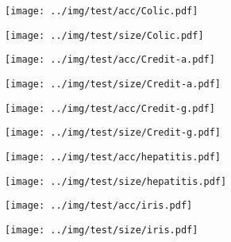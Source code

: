 \begin{figure}[h]
\centering
\begin{subfigure}[b]{0.45\textwidth}
\texttt{[image: ../img/test/acc/Colic.pdf]}
\caption{}
\end{subfigure}
\qquad
\begin{subfigure}[b]{0.45\textwidth}
\texttt{[image: ../img/test/size/Colic.pdf]}
\caption{}
\end{subfigure}
\caption{}
\end{figure}

\begin{figure}[h]
\centering
\begin{subfigure}[b]{0.45\textwidth}
\texttt{[image: ../img/test/acc/Credit-a.pdf]}
\caption{}
\end{subfigure}
\qquad
\begin{subfigure}[b]{0.45\textwidth}
\texttt{[image: ../img/test/size/Credit-a.pdf]}
\caption{}
\end{subfigure}
\caption{}
\end{figure}

\begin{figure}[h]
\centering
\begin{subfigure}[b]{0.45\textwidth}
\texttt{[image: ../img/test/acc/Credit-g.pdf]}
\caption{}
\end{subfigure}
\qquad
\begin{subfigure}[b]{0.45\textwidth}
\texttt{[image: ../img/test/size/Credit-g.pdf]}
\caption{}
\end{subfigure}
\caption{}
\end{figure}

\begin{figure}[h]
\centering
\begin{subfigure}[b]{0.45\textwidth}
\texttt{[image: ../img/test/acc/hepatitis.pdf]}
\caption{}
\end{subfigure}
\qquad
\begin{subfigure}[b]{0.45\textwidth}
\texttt{[image: ../img/test/size/hepatitis.pdf]}
\caption{}
\end{subfigure}
\caption{}
\end{figure}

\begin{figure}[h]
\centering
\begin{subfigure}[b]{0.45\textwidth}
\texttt{[image: ../img/test/acc/iris.pdf]}
\caption{}
\end{subfigure}
\qquad
\begin{subfigure}[b]{0.45\textwidth}
\texttt{[image: ../img/test/size/iris.pdf]}
\caption{}
\end{subfigure}
\caption{}
\end{figure}

